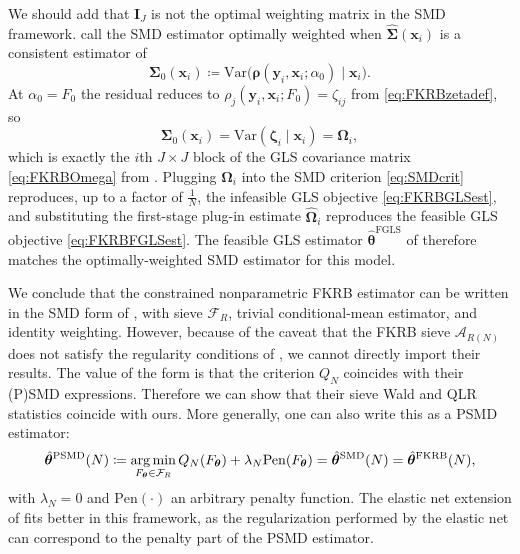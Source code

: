 We should add that $\bm{I}_J$ is not the optimal weighting matrix in the SMD framework.
\citet{ChenPouzo2015} call the SMD estimator optimally weighted when $\hat{\bm{\Sigma}}(\bm{x}_i)$ is a consistent estimator of
\begin{equation}
\label{eq:Sigma0def}
    \bm{\Sigma}_0(\bm{x}_i) \coloneq \mathrm{Var}\bigl(\bm{\rho}(\bm{y}_i, \bm{x}_i; \alpha_0)\mid \bm{x}_i\bigr).
\end{equation}
At $\alpha_0 = F_0$ the residual reduces to $\rho_j(\bm{y}_i, \bm{x}_i; F_0) = \zeta_{ij}$ from \cref{eq:FKRBzetadef}, so
\begin{equation}
\label{eq:FKRBSigma0equalsOmega}
    \bm{\Sigma}_0(\bm{x}_i) = \mathrm{Var}(\bm{\zeta}_i \mid \bm{x}_i) = \bm{\Omega}_i,
\end{equation}
which is exactly the $i$th $J\times J$ block of the GLS covariance matrix \cref{eq:FKRBOmega} from .
Plugging $\bm{\Omega}_i$ into the SMD criterion \cref{eq:SMDcrit} reproduces, up to a factor of $\frac{1}{N}$, the infeasible GLS objective \cref{eq:FKRBGLSest}, and substituting the first-stage plug-in estimate $\hat{\bm{\Omega}}_i$ reproduces the feasible GLS objective \cref{eq:FKRBFGLSest}.
The feasible GLS estimator $\hat{\bm{\theta}}^{\mathrm{FGLS}}$ of  therefore matches the optimally-weighted SMD estimator for this model.

We conclude that the constrained nonparametric FKRB estimator can be written in the SMD form of \citet{ChenPouzo2015}, with sieve $\mathcal{F}_R$, trivial conditional-mean estimator, and identity weighting.
However, because of the caveat that the FKRB sieve $\mathcal{A}_{R(N)}$ does not satisfy the regularity conditions of \citet{ChenPouzo2015}, we cannot directly import their results.
The value of the form is that the criterion $Q_N$ coincides with their (P)SMD expressions.
Therefore we can show that their sieve Wald and QLR statistics coincide with ours.
More generally, one can also write this as a PSMD estimator:
\begin{equation}
\label{eq:PSMDdef}
    \hat{\bm{\theta}}^{\mathrm{PSMD}}(N) \coloneq \operatorname*{arg\,min}_{F_{\bm{\theta}} \in \mathcal{F}_R} {Q_N(F_{\bm{\theta}}) + \lambda_N \mathrm{Pen}(F_{\bm{\theta}})} = \hat{\bm{\theta}}^{\mathrm{SMD}}(N) = \hat{\bm{\theta}}^{\mathrm{FKRB}}(N),
\end{equation}
with $\lambda_N = 0$ and $\mathrm{Pen}(\cdot)$ an arbitrary penalty function.
The elastic net extension of \citet{HeissHetzeneckerOsterhaus2022} fits better in this framework, as the regularization performed by the elastic net can correspond to the penalty part of the PSMD estimator.

